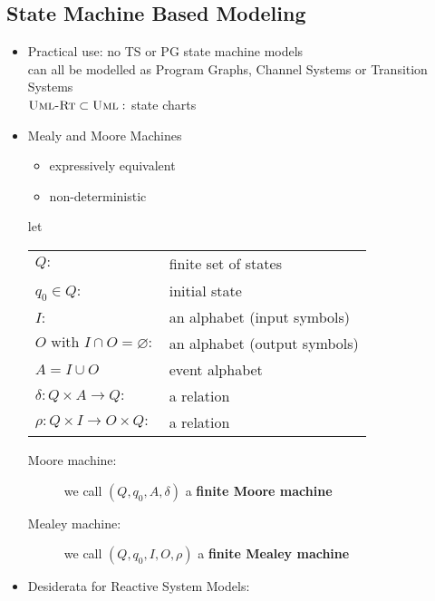 \documentclass[a4paper, 10pt]{article}
\begin{document}
\subsection*{State Machine Based Modeling}
\begin{itemize}
    \item Practical use: no TS or PG \follows state machine models \\
    can all be modelled as Program Graphs, Channel Systems or Transition Systems \\
    $\textsc{Uml-Rt} \subset \textsc{Uml}:$ state charts
    \item Mealy and Moore Machines \\
    \begin{itemize}
        \item  expressively equivalent
        \item non-deterministic
    \end{itemize}
    \begin{shaded} let
    \begin{tabular}{ll}
        $Q:$ & finite set of states \\
        $q_0\in Q$: & initial state \\
        $I$: & an alphabet (input symbols) \\
        $O \textrm{ with }I\cap O=\varnothing:$ & an alphabet (output symbols) \\
        $A=I\cup O$ & event alphabet \\
        $\delta: Q\times A\to Q:$ & a relation \\
        $\rho: Q\times I\to O\times Q:$ & a relation \\
        \end{tabular}
    \begin{description}
        \item[Moore machine:] we call $(Q, q_0, A, \delta)$ a \textbf{finite Moore machine}
        \begin{center}
        \scalebox{1}{}
        \end{center}
        \item[Mealey machine:] we call $(Q,q_0,I,O,\rho)$ a \textbf{finite Mealey machine}
        \begin{center}
        \scalebox{1}{}
        \end{center}
    \end{description}
\end{shaded}
    \item Desiderata for Reactive System Models:

\end{itemize}
\end{document}
